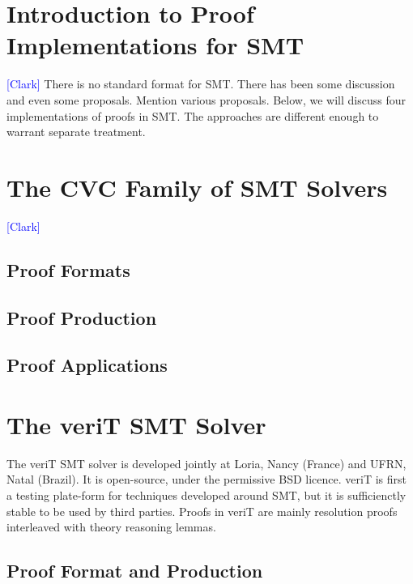 \documentclass{llncs}
\newcommand{\Note}[1]{\textcolor{blue}{[#1]}}
\begin{document}


\section{Introduction to Proof Implementations for SMT}
\label{sec:format}

\Note{Clark}
There is no standard format for SMT.  There has been some discussion and even
some proposals.  Mention various proposals.  Below, we will discuss four
implementations of proofs in SMT.  The approaches are different enough to
warrant separate treatment.

\section{The CVC Family of SMT Solvers}
\Note{Clark}
\subsection{Proof Formats}
\subsection{Proof Production}
\subsection{Proof Applications}

\section{The veriT SMT Solver}
\label{sec:veriT}

The veriT SMT solver is developed jointly at Loria, Nancy (France) and UFRN,
Natal (Brazil).  It is open-source, under the permissive BSD licence.  veriT is
first a testing plate-form for techniques developed around SMT, but it is
sufficienctly stable to be used by third parties.  Proofs in veriT are mainly
resolution proofs interleaved with theory reasoning lemmas.

\subsection{Proof Format and Production}
\end{document}
